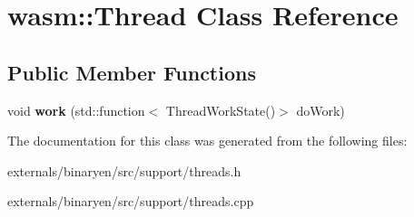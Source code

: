 \hypertarget{classwasm_1_1_thread}{}\section{wasm\+:\+:Thread Class Reference}
\label{classwasm_1_1_thread}
\subsection*{Public Member Functions}
\begin{DoxyCompactItemize}
\item 
\mbox{\label{classwasm_1_1_thread_ae4074dbf9c694423a0d8c365015e75a1}} 
void {\bfseries work} (std\+::function$<$ Thread\+Work\+State()$>$ do\+Work)
\end{DoxyCompactItemize}


The documentation for this class was generated from the following files\+:\begin{DoxyCompactItemize}
\item 
externals/binaryen/src/support/threads.\+h\item 
externals/binaryen/src/support/threads.\+cpp\end{DoxyCompactItemize}
